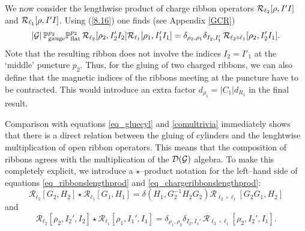 \documentclass[nofootinbib,superscriptaddress,eqsecnum,tightenlines,11pt]{revtex4-1}
\def\nn{\nonumber}
\def\q{\qquad}
\def\mG{\mathcal{G}}
\def\mR{\mathcal{R}}
\def\be{\begin{equation}}
\def\ee{\end{equation}}
\def\ba{\begin{eqnarray}}
\def\ea{\end{eqnarray}}
\begin{document}
We now consider the lengthwise product of charge ribbon operators ${\cal R}_{\ell_2}[\rho, I' I]$ and ${\cal R}_{\ell_1}[\rho, I' I]$.
Using (\ref{8.16}) one finds (see Appendix \ref{GCR})
\ba
|{\cal G}|\,{\mathbb P}^{p_2}_\text{gauge}  {\mathbb P}^{p_2}_\text{flat} \, {\cal R}_{\ell_2}[\rho_2, I'_2 I_2]   {\cal R}_{\ell_1}[\rho_1, I'_1 I_1]
= \delta_{\rho_2,\rho_1}  \delta_{I_2, I_1'}  \,   {\cal R}_{\ell_2\circ\ell_1}[\rho_2, I'_2 I_1] .
\label{eq_chargeribbonslengthprod}
\ea
Note that the resulting ribbon does not involve the indices $I_2=I'_1$ at the `middle' puncture $p_2$. 
Thus, for the gluing of two charged ribbons, we can also define that the magnetic indices of the ribbons meeting at the puncture have to be contracted. 
This would introduce an extra factor $d_{\rho_1}= |C_1| d_{R_1} $ in the final result. 

Comparison with equations \eqref{eq_gluecyl} and \eqref{comultrivia} immediately shows that there is a direct relation between the gluing of cylinders and the lenghtwise multiplication of open ribbon operators.
This means that the composition of ribbons agrees with the multiplication of the ${\cal D}(\mG)$ algebra.
To make this completely explicit, we introduce a $\star$--product notation for the left--hand side of equations \eqref{eq_ribbonslengthprod} and \eqref{eq_chargeribbonslengthprod}:
\be
	\mR_{\ell_2}[G_2,H_2] \star \mR_{\ell_1}[G_1,H_1] = \delta(H_1, G_2^{-1}H_2G_2)\mR_{\ell_2\circ \ell_1}[G_2G_1,H_2]
\ee
and
\be
	\mR_{\ell_2}[\rho_2,I_2',I_2]\star \mR_{\ell_1}[\rho_1,I_1',I_1] = \delta_{\rho_1,\rho_2} \delta_{I_2,I_1'} \,  \mR_{\ell_2\circ \ell_1}[\rho_2, I_2',I_1].
	\label{brexit?}
\ee
\end{document}
